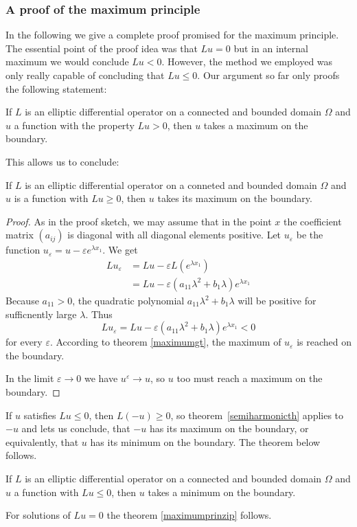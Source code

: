 {\small
\subsubsection{A proof of the maximum principle}
In the following we give a complete proof promised for the maximum principle.
The essential point of the proof idea was that $Lu=0$ but in an internal
maximum we would conclude $Lu<0$.
However, the method we employed was only really capable of concluding that
$Lu\le 0$.
Our argument so far only proofs the following statement:
\begin{satz}
\label{maximumgt}
If $L$ is an elliptic differential operator on a connected and
bounded domain $\Omega$ and $u$ a function with the property $Lu>0$, then
$u$ takes a maximum on the boundary.
\end{satz}

This allows us to conclude:
\begin{satz}
\label{semiharmonicth}
If $L$ is an elliptic differential operator on a conneted and
bounded domain $\Omega$ and $u$ is a function with $Lu\ge  0$,
then $u$ takes its maximum on the boundary.
\end{satz}

\begin{proof}
As in the proof sketch, we may assume that in the point $x$ the 
coefficient matrix $(a_{ij})$ is diagonal with all diagonal elements
positive.
Let $u_{\varepsilon}$ be the function
$u_{\varepsilon}=u-\varepsilon e^{\lambda x_1}$.
We get
\begin{align*}
Lu_{\varepsilon}&=Lu-\varepsilon L(e^{\lambda x_1})\\
&=Lu-\varepsilon(a_{11}\lambda^2+b_1\lambda)e^{\lambda x_1}
\end{align*}
Because $a_{11}>0$,
the quadratic polynomial $a_{11}\lambda^2+b_1\lambda$ will be positive
for sufficnently large $\lambda$.
Thus
\[
Lu_{\varepsilon}= Lu-\varepsilon(a_{11}\lambda^2+b_1\lambda)e^{\lambda x_1}<0
\]
for every $\varepsilon$.
According to theorem \ref{maximumgt},
the maximum of $u_\varepsilon$ is reached on the boundary.

In the limit $\varepsilon\to 0$ we have $u^\varepsilon\to u$, so
$u$ too must reach a maximum on the boundary.
\end{proof}

If $u$ satisfies $Lu \le 0$, then $L(-u)\ge 0$, so
theorem~\ref{semiharmonicth} applies to $-u$ and lets us conclude, that
$-u$ has its maximum on the boundary, or equivalently, that $u$ has its
minimum on the boundary.
The theorem below follows.

\begin{satz}
If $L$ is an elliptic differential operator on a connected and
bounded domain $\Omega$ and $u$ a function with $Lu\le 0$, then
$u$ takes a minimum on the boundary.
\end{satz}

For solutions of $Lu=0$ the theorem \ref{maximumprinzip} follows.
}

